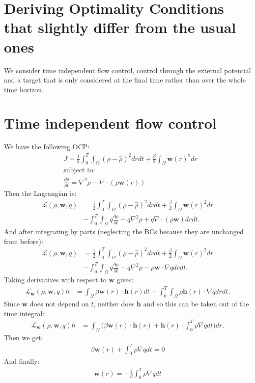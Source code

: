\documentclass[11pt, a4paper]{article}
\theoremstyle{definition}
\newcommand{\w}{\mathbf{w}}
\newcommand{\h}{\mathbf{h}}
\begin{document}
	\section*{Deriving Optimality Conditions that slightly differ from the usual ones}
	We consider time independent flow control, control through the external potential and a target that is only considered at the final time rather than over the whole time horizon.
	\section{Time independent flow control}
	We have the following OCP:
	\begin{align*}
		&J = \frac{1}{2}\int_0^T \int_\Omega (\rho - \widehat \rho)^2 dr dt + \frac{\beta}{2} \int_\Omega \w(r)^2 dr\\
		&\text{subject to:}\\
		&\frac{\partial \rho}{\partial t} = \nabla^2 \rho - \nabla \cdot (\rho \w(r))
	\end{align*}
	Then the Lagrangian is:
	\begin{align*}
		\mathcal{L}(\rho,\w, q) &=  \frac{1}{2}\int_0^T \int_\Omega (\rho - \widehat \rho)^2 dr dt + \frac{\beta}{2} \int_\Omega \w(r)^2 dr \\
		&- \int_0^T \int_\Omega q\frac{\partial \rho}{\partial t} - q\nabla^2 \rho + q\nabla \cdot (\rho \w) dr dt.
	\end{align*}
	And after integrating by parts (neglecting the BCs because they are unchanged from before):
	\begin{align*}
		\mathcal{L}(\rho,\w, q) &=  \frac{1}{2}\int_0^T \int_\Omega (\rho - \widehat \rho)^2 dr dt + \frac{\beta}{2} \int_\Omega \w(r)^2 dr \\
		&- \int_0^T \int_\Omega q\frac{\partial \rho}{\partial t} - q\nabla^2 \rho -  \rho \w \cdot \nabla q dr dt.
	\end{align*}
	Taking derivatives with respect to $\w$ gives:
	\begin{align*}
		\mathcal{L}_\w(\rho,\w, q)h &= \int_\Omega \beta \w(r) \cdot \h(r) dt + \int_0^T \int_\Omega \rho \h(r) \cdot \nabla q dr dt.
	\end{align*}
	Since $\w$ does not depend on $t$, neither does $\h$ and so this can be taken out of the time integral:
	\begin{align*}
		\mathcal{L}_\w(\rho,\w, q)h &= \int_\Omega \bigg( \beta \w(r) \cdot \h(r)  + \h(r) \cdot \int_0^T \rho  \nabla q dt \bigg) dr.
	\end{align*}
	Then we get:
	\begin{align*}
		\beta \w(r)  +  \int_0^T \rho  \nabla q dt = 0
	\end{align*}
	And finally:
	\begin{align*}
		\w(r) = - \frac{1}{\beta} \int_0^T \rho  \nabla q dt
	\end{align*}
	
\end{document}
